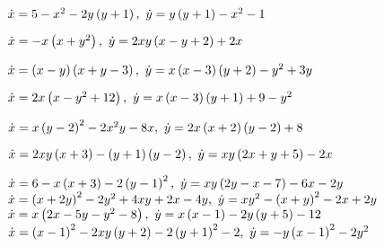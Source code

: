 	\begin{enumtasks}

		\label{stability_points:types_poly2}
		\item \( \dot{x} = 5 - x^2 - 2 y \left( y + 1 \right), ~ \dot{y} = y\left( y + 1 \right) - x^2 - 1 \) %
		\item \( \dot{x} = - x \left( x + y^2 \right), ~ \dot{y} = 2xy \left( x - y + 2 \right) + 2x \) %
		\item \( \dot{x} = \left( x - y \right)\left( x + y - 3 \right), ~ \dot{y} = x\left( x - 3 \right) \left( y + 2 \right) - y^{2} + 3 y \) %
		\item \( \dot{x} = 2x \left( x - y^2 + 12 \right), ~ \dot{y} = x\left( x - 3 \right) \left( y + 1 \right) + 9 - y^2 \) %
		\item \( \dot{x} = x \left( y - 2 \right)^2 - 2x^2 y - 8x, ~ \dot{y} = 2x \left( x + 2 \right)\left( y - 2 \right) + 8 \) %
		\item \( \dot{x} = 2xy \left( x + 3 \right) - \left( y + 1 \right) \left( y - 2 \right), ~ \dot{y} = xy \left( 2x + y + 5 \right) - 2 x \) %
		
		\label{stability_points:types_poly_hard}
		\item \( \dot{x} = 6 - x \left( x + 3 \right) - 2 \left( y-1 \right)^2, ~ \dot{y} = xy \left( 2y - x - 7 \right) - 6x - 2y \) %
		\itemstar \( \dot{x} = \left( x + 2y \right)^2 - 2y^2 + 4xy + 2x - 4y, ~ \dot{y} = x y^2 - \left( x + y \right)^2 - 2 x + 2 y \) %
		\itemstar \( \dot{x} = x \left( 2x - 5y - y^2 - 8 \right), ~ \dot{y} = x\left( x - 1 \right) - 2 y \left( y + 5 \right) - 12 \) %
		\itemstar \( \dot{x} = \left( x - 1 \right)^2 - 2xy \left( y + 2 \right) - 2 \left( y + 1 \right)^2 - 2, ~ \dot{y} = - y\left( x - 1 \right)^2 - 2y^2 \) %

	\end{enumtasks}

